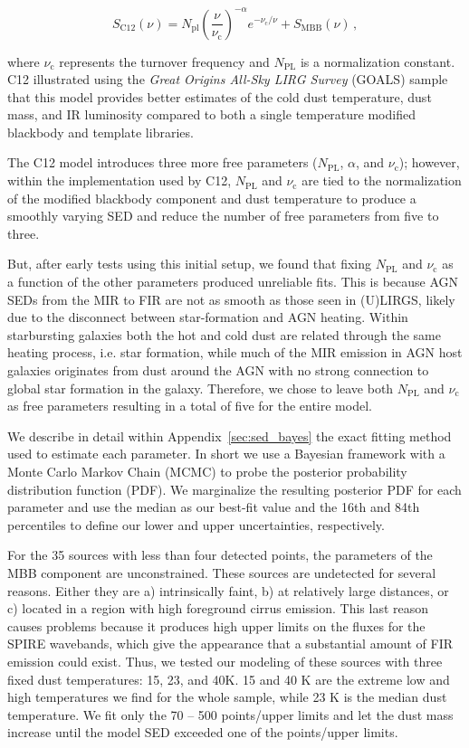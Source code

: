 \documentclass[fleqn, usenatbib]{mnras}
\begin{document}
\begin{equation}\label{eq:casey}
S_{\mathrm{C12}}(\nu) = N_{\mathrm{pl}}\left(\frac{\nu}{\nu_{\mathrm{c}}}\right)^{-\alpha}e^{-\nu_{\mathrm{c}}/\nu} + S_{\mathrm{MBB}}(\nu)\,,
\end{equation}

\noindent where $\nu_{\mathrm{c}}$ represents the turnover frequency and $N_{\mathrm{PL}}$ is a normalization constant. C12 illustrated using the \textit{Great Origins All-Sky LIRG Survey} (GOALS) sample that this model provides better estimates of the cold dust temperature, dust mass, and IR luminosity compared to both a single temperature modified blackbody and template libraries.

The C12 model introduces three more free parameters ($N_{\mathrm{PL}}$, $\alpha$, and $\nu_{\mathrm{c}}$); however, within the implementation used by C12, $N_{\mathrm{PL}}$ and $\nu_{\mathrm{c}}$ are tied to the normalization of the modified blackbody component and dust temperature to produce a smoothly varying SED and reduce the number of free parameters from five to three. 

But, after early tests using this initial setup, we found that fixing $N_{\mathrm{PL}}$ and $\nu_{\mathrm{c}}$ as a function of the other parameters produced unreliable fits. This is because AGN SEDs from the MIR to FIR are not as smooth as those seen in (U)LIRGS, likely due to the disconnect between star-formation and AGN heating. Within starbursting galaxies both the hot and cold dust are related through the same heating process, i.e. star formation, while much of the MIR emission in AGN host galaxies originates from dust around the AGN with no strong connection to global star formation in the galaxy. Therefore, we chose to leave both $N_{\mathrm{PL}}$ and $\nu_{\mathrm{c}}$ as free parameters resulting in a total of five for the entire model.

We describe in detail within Appendix~\ref{sec:sed_bayes} the exact fitting method used to estimate each parameter. In short we use a Bayesian framework with a Monte Carlo Markov Chain (MCMC) to probe the posterior probability distribution function (PDF). We marginalize the resulting posterior PDF for each parameter and use the median as our best-fit value and the 16th and 84th percentiles to define our lower and upper uncertainties, respectively. 

For the 35 sources with less than four detected points, the parameters of the MBB component are unconstrained. These sources are undetected for several reasons. Either they are a) intrinsically faint, b) at relatively large distances, or c) located in a region with high foreground cirrus emission. This last reason causes problems because it produces high upper limits on the fluxes for the SPIRE wavebands, which give the appearance that a substantial amount of FIR emission could exist. Thus, we tested our modeling of these sources with three fixed dust temperatures: 15, 23, and 40K. 15 and 40 K are the extreme low and high temperatures we find for the whole sample, while 23 K is the median dust temperature. We fit only the 70 -- 500 \micron{} points/upper limits and let the dust mass increase until the model SED exceeded one of the points/upper limits. 
\end{document}
